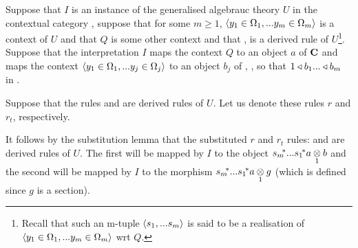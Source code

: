 \begin{lemma}
\label{omegarealisationwrtQ}
Suppose that $I$ is an instance of the generalised algebrauc theory $U$ in the contextual category \catc,
suppose  that for some $m \geq 1$, $\encyOmega{m}$ is a context of $U$ and  that $Q$ is some other context and that 
 \foreachj,  is a derived rule of $U$\footnote{Recall that such an m-tuple $\tuple{\sm}$ is said to be a realisation of 
$\encyOmega{m}$ wrt $Q$.}.  Suppose that the interpretation $I$  maps the context $Q$ to an object $a$  of $\catc$ and maps
the context $\encyOmega{j}$ to an object $b_j$ of \catc, \foreachj, so that $1 \base b_1 ... \base b_m$ in \catc. 

Suppose that  the rules 
 and   are derived rules of $U$. 
Let us denote these rules $r$ and $r_t$, respectively.  

It follows by the substitution lemma 
that the substituted $r$ and $r_t$ rules: 
and   are derived rules of $U$. 
The first  will be mapped by $I$ to the object $\smstar...\sonestar\crossx{a}{b}{1}$ and the second will
be mapped by $I$ to the morphism  $\smstar...\sonestar\crossx{a}{g}{1}$ (which is defined since $g$ is a section).
\end{lemma}
